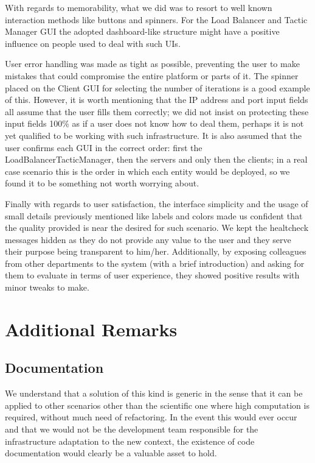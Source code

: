 \documentclass[12pt]{article}
\begin{document}
With regards to memorability, what we did was to resort to well known interaction methods like buttons and spinners.
For the Load Balancer and Tactic Manager GUI the adopted dashboard-like structure might have a positive influence on people used to deal with such UIs.

User error handling was made as tight as possible, preventing the user to make mistakes that could compromise the entire platform or parts of it.
The spinner placed on the Client GUI for selecting the number of iterations is a good example of this.
However, it is worth mentioning that the IP address and port input fields all assume that the user fills them correctly; we did not insist on protecting these
input fields 100\% as if a user does not know how to deal them, perhaps it is not yet qualified to be working with such infrastructure.
It is also assumed that the user confirms each GUI in the correct order: first the LoadBalancerTacticManager, then the servers and only then the clients; in
a real case scenario this is the order in which each entity would be deployed, so we found it to be something not worth worrying about.

Finally with regards to user satisfaction, the interface simplicity and the usage of small details previously mentioned like labels and colors made us confident
that the quality provided is near the desired for such scenario.
We kept the healtcheck messages hidden as they do not provide any value to the user and they serve their purpose being transparent to him/her.
Additionally, by exposing colleagues from other departments to the system (with a brief introduction) and asking for them to evaluate in terms of user experience,
they showed positive results with minor tweaks to make.

\newpage
\section{Additional Remarks} \label{remarks} %

\subsection{Documentation} \label{documentation} %

We understand that a solution of this kind is generic in the sense that it can be applied to other scenarios other than the scientific one where high computation
is required, without much need of refactoring.
In the event this would ever occur and that we would not be the development team responsible for the infrastructure adaptation to the new context,
the existence of code documentation would clearly be a valuable asset to hold.
\end{document}
